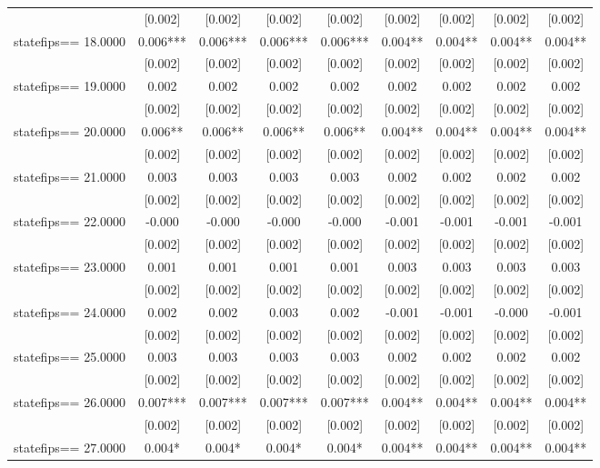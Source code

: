 \documentclass[]{article}
\begin{document}
\begin{tabular}{lcccccccc}
 & [0.002] & [0.002] & [0.002] & [0.002] & [0.002] & [0.002] & [0.002] & [0.002] \\
statefips==    18.0000 & 0.006*** & 0.006*** & 0.006*** & 0.006*** & 0.004** & 0.004** & 0.004** & 0.004** \\
 & [0.002] & [0.002] & [0.002] & [0.002] & [0.002] & [0.002] & [0.002] & [0.002] \\
statefips==    19.0000 & 0.002 & 0.002 & 0.002 & 0.002 & 0.002 & 0.002 & 0.002 & 0.002 \\
 & [0.002] & [0.002] & [0.002] & [0.002] & [0.002] & [0.002] & [0.002] & [0.002] \\
statefips==    20.0000 & 0.006** & 0.006** & 0.006** & 0.006** & 0.004** & 0.004** & 0.004** & 0.004** \\
 & [0.002] & [0.002] & [0.002] & [0.002] & [0.002] & [0.002] & [0.002] & [0.002] \\
statefips==    21.0000 & 0.003 & 0.003 & 0.003 & 0.003 & 0.002 & 0.002 & 0.002 & 0.002 \\
 & [0.002] & [0.002] & [0.002] & [0.002] & [0.002] & [0.002] & [0.002] & [0.002] \\
statefips==    22.0000 & -0.000 & -0.000 & -0.000 & -0.000 & -0.001 & -0.001 & -0.001 & -0.001 \\
 & [0.002] & [0.002] & [0.002] & [0.002] & [0.002] & [0.002] & [0.002] & [0.002] \\
statefips==    23.0000 & 0.001 & 0.001 & 0.001 & 0.001 & 0.003 & 0.003 & 0.003 & 0.003 \\
 & [0.002] & [0.002] & [0.002] & [0.002] & [0.002] & [0.002] & [0.002] & [0.002] \\
statefips==    24.0000 & 0.002 & 0.002 & 0.003 & 0.002 & -0.001 & -0.001 & -0.000 & -0.001 \\
 & [0.002] & [0.002] & [0.002] & [0.002] & [0.002] & [0.002] & [0.002] & [0.002] \\
statefips==    25.0000 & 0.003 & 0.003 & 0.003 & 0.003 & 0.002 & 0.002 & 0.002 & 0.002 \\
 & [0.002] & [0.002] & [0.002] & [0.002] & [0.002] & [0.002] & [0.002] & [0.002] \\
statefips==    26.0000 & 0.007*** & 0.007*** & 0.007*** & 0.007*** & 0.004** & 0.004** & 0.004** & 0.004** \\
 & [0.002] & [0.002] & [0.002] & [0.002] & [0.002] & [0.002] & [0.002] & [0.002] \\
statefips==    27.0000 & 0.004* & 0.004* & 0.004* & 0.004* & 0.004** & 0.004** & 0.004** & 0.004** \\

\end{tabular}
\end{document}
